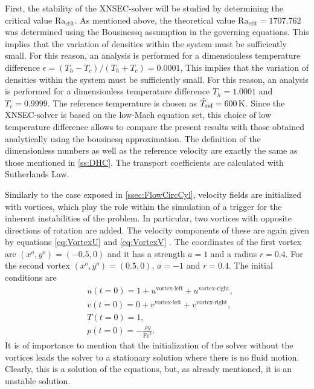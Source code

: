 First, the stability of the XNSEC-solver will be studied by determining the critical value $\text{Ra}_{\text{crit}}$. As mentioned above, the theoretical value $\text{Ra}_{\text{crit}} = 1707.762$ was determined using the Bousinessq assumption in the governing equations. This implies that the variation of densities within the system must be sufficiently small. For this reason, an analysis is performed for a dimensionless temperature difference $\epsilon = (T_h-T_c)/(T_h+T_c) = 0.0001$, This implies that the variation of densities within the system must be sufficiently small. For this reason, an analysis is performed for a dimensionless temperature difference $T_h = 1.0001$ and $T_c = 0.9999$. The reference temperature is chosen as $\hat T_{\text{ref}} = \SI{600}{\kelvin}$. Since the XNSEC-solver is based on the low-Mach equation set, this choice of low temperature difference allows to compare the present results with those obtained analytically using the bousinesq approximation. The definition of the dimensionless numbers as well as the reference velocity are exactly the same as those mentioned in \cref{ss:DHC}. The transport coefficients are calculated with Sutherlands Law.

Similarly to the case exposed in \cref{ssec:FlowCircCyl}, velocity fields are initialized with vortices, which play the role within the simulation of a trigger for the inherent instabilities of the problem. In particular, two vortices with opposite directions of rotation are added. The velocity components of these are again given by equations \cref{eq:VortexU} and \cref{eq:VortexV} . The coordinates of the first vortex are $(x^o,y^o) = (-0.5,0)$ and it has a strength $a = 1$ and a radius $r=0.4$. For the second vortex $(x^o,y^o) = (0.5,0)$, $a = -1$ and $r=0.4$. The initial conditions are
\begin{subequations} 
	\begin{align}
		&u(t=0) = 1 + u^{\text{vortex-left}} + u^{\text{vortex-right}},  \\
		&v(t=0) = 0 + v^{\text{vortex-left}}+ v^{\text{vortex-right}},  \\
		&T(t=0) = 1,\\
		&p(t=0) = -\frac{\rho y}{\text{Fr}^2}.
	\end{align}
\end{subequations}
It is of importance to mention that the initialization of the solver without the vortices leads the solver to a stationary solution where there is no fluid motion. Clearly, this is a solution of the equations, but, as already mentioned, it is an unstable solution. 

